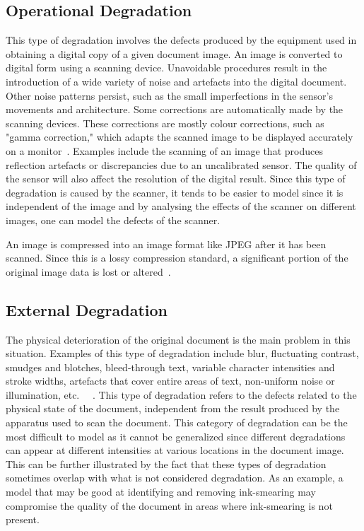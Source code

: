 \documentclass[a4paper, 12pt]{report}
\begin{document}
\subsection{Operational Degradation}
This type of degradation involves the defects produced by the equipment used in obtaining a digital copy of a given document image. An image is converted to digital form using a scanning device. Unavoidable procedures result in the introduction of a wide variety of noise and artefacts into the digital document. Other noise patterns persist, such as the small imperfections in the sensor's movements and architecture. Some corrections are automatically made by the scanning devices. These corrections are mostly colour corrections, such as "gamma correction," which adapts the scanned image to be displayed accurately on a monitor~\cite{smoaca2011id}. Examples include the scanning of an image that produces reflection artefacts or discrepancies due to an uncalibrated sensor. The quality of the sensor will also affect the resolution of the digital result. Since this type of degradation is caused by the scanner, it tends to be easier to model since it is independent of the image and by analysing the effects of the scanner on different images, one can model the defects of the scanner.\par

An image is compressed into an image format like JPEG after it has been scanned. Since this is a lossy compression standard, a significant portion of the original image data is lost or altered~\cite{eskenazi2016stability}. \par

\subsection{External Degradation}
The physical deterioration of the original document is the main problem in this situation. Examples of this type of degradation include blur, fluctuating contrast, smudges and blotches, bleed-through text, variable character intensities and stroke widths, artefacts that cover entire areas of text, non-uniform noise or illumination, etc.~\cite{gatos2006adaptive} ~\cite{ait2022innovative}. This type of degradation refers to the defects related to the physical state of the document, independent from the result produced by the apparatus used to scan the document. This category of degradation can be the most difficult to model as it cannot be generalized since different degradations can appear at different intensities at various locations in the document image. This can be further illustrated by the fact that these types of degradation sometimes overlap with what is not considered degradation. As an example, a model that may be good at identifying and removing ink-smearing may compromise the quality of the document in areas where ink-smearing is not present.
\end{document}
